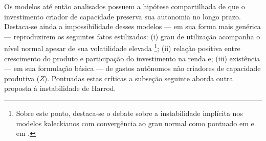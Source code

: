  
Os modelos até então analisados possuem a hipótese compartilhada de que o investimento criador de capacidade preserva sua autonomia no longo prazo.  
Destaca-se ainda a impossibilidade desses modelos --- em sua forma mais genérica --- reproduzirem os seguintes fatos estilizados: 
(i) grau de utilização acompanha o nível normal apesar de sua volatilidade elevada \cites[p.~110--111]{serrano_long_1995-1}{gahn_empirical_2019} \footnote{Sobre este ponto, destaca-se o debate sobre a instabilidade implícita nos modelos kaleckianos com convergência ao grau normal como pontuado em \textcite{hein_instability_2011} e em \textcite{allain_tackling_2015}.}; 
(ii) relação positiva entre crescimento do produto e participação do investimento na renda \cites{braga_investment_2018}{haluska_growth_2019} e;
(iii) existência --- em sua formulação básica --- de gastos autônomos não criadores de capacidade produtiva ($Z$).
Pontuadas estas críticas a subseção seguinte aborda outra proposta à instabilidade de Harrod.


